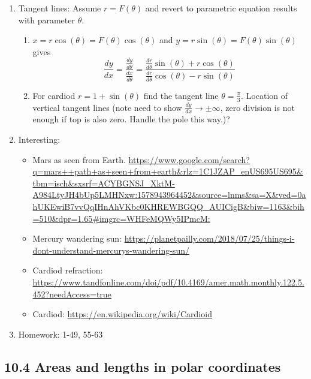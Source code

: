 \documentclass{article}
\begin{document}
\begin{enumerate}
\item Tangent lines: Assume $r=F(\theta)$ and revert to parametric equation results with parameter $\theta$.
\begin{enumerate}
\item $x=r\cos(\theta)=F(\theta)\cos(\theta)$ and $y=r\sin(\theta)=F(\theta)\sin(\theta)$ gives
\[
\frac{dy}{dx} = \frac{\frac{dy}{d\theta}}{\frac{dx}{d\theta}}
= \frac{\frac{dr}{d\theta}\sin(\theta) + r\cos(\theta)}{\frac{dr}{d\theta}\cos(\theta) - r\sin(\theta)} 
\]
\item For cardiod $r=1+\sin(\theta)$ find the tangent line $\theta=\frac{\pi}{3}$. Location of vertical tangent lines (note need to show $\frac{dy}{dx} \rightarrow \pm \infty$, zero division is not enough if top is also zero. Handle the pole this way.)?
\end{enumerate}

\item Interesting: 
\begin{itemize}
\item Mars as seen from Earth. \url{https://www.google.com/search?q=mars++path+as+seen+from+earth&rlz=1C1JZAP_enUS695US695&tbm=isch&sxsrf=ACYBGNSJ_XktM-A984LtyJH4bUp5LMHNxw:1578943964452&source=lnms&sa=X&ved=0ahUKEwiB7vvQqIHnAhVKbc0KHREWBGQQ_AUICigB&biw=1163&bih=510&dpr=1.65#imgrc=WHFeMQWy5IPmcM:}
\item Mercury wandering sun: \url{https://planetpailly.com/2018/07/25/things-i-dont-understand-mercurys-wandering-sun/}
\item Cardiod refraction: \url{https://www.tandfonline.com/doi/pdf/10.4169/amer.math.monthly.122.5.452?needAccess=true}
\item Cardiod: \url{https://en.wikipedia.org/wiki/Cardioid}
\end{itemize}

\item Homework: 1-49, 55-63

\end{enumerate}

\subsection{10.4 Areas and lengths in polar coordinates}
\end{document}
